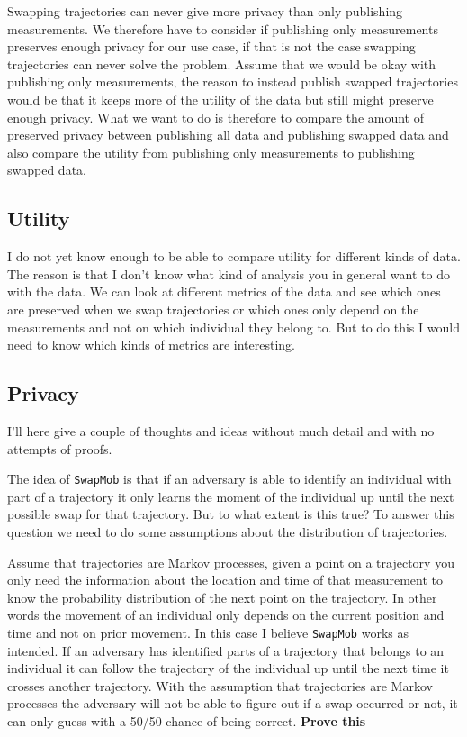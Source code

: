 \documentclass[11pt]{article}
\begin{document}
Swapping trajectories can never give more privacy than only publishing
measurements. We therefore have to consider if publishing only
measurements preserves enough privacy for our use case, if that is not
the case swapping trajectories can never solve the problem. Assume
that we would be okay with publishing only measurements, the reason to
instead publish swapped trajectories would be that it keeps more of
the utility of the data but still might preserve enough privacy. What
we want to do is therefore to compare the amount of preserved privacy
between publishing all data and publishing swapped data and also
compare the utility from publishing only measurements to publishing
swapped data.

\subsection{Utility}
\label{sec:orge9608d0}
I do not yet know enough to be able to compare utility for different
kinds of data. The reason is that I don't know what kind of analysis
you in general want to do with the data. We can look at different
metrics of the data and see which ones are preserved when we swap
trajectories or which ones only depend on the measurements and not on
which individual they belong to. But to do this I would need to know
which kinds of metrics are interesting.

\subsection{Privacy}
\label{sec:orgd5206f0}
I'll here give a couple of thoughts and ideas without much detail and
with no attempts of proofs.

The idea of \texttt{SwapMob} is that if an adversary is able to identify an
individual with part of a trajectory it only learns the moment of the
individual up until the next possible swap for that trajectory. But to
what extent is this true? To answer this question we need to do some
assumptions about the distribution of trajectories.

Assume that trajectories are Markov processes, given a point on a
trajectory you only need the information about the location and time
of that measurement to know the probability distribution of the next
point on the trajectory. In other words the movement of an individual
only depends on the current position and time and not on prior
movement. In this case I believe \texttt{SwapMob} works as intended. If an
adversary has identified parts of a trajectory that belongs to an
individual it can follow the trajectory of the individual up until the
next time it crosses another trajectory. With the assumption that
trajectories are Markov processes the adversary will not be able to
figure out if a swap occurred or not, it can only guess with a 50/50
chance of being correct. \textbf{Prove this}
\end{document}
